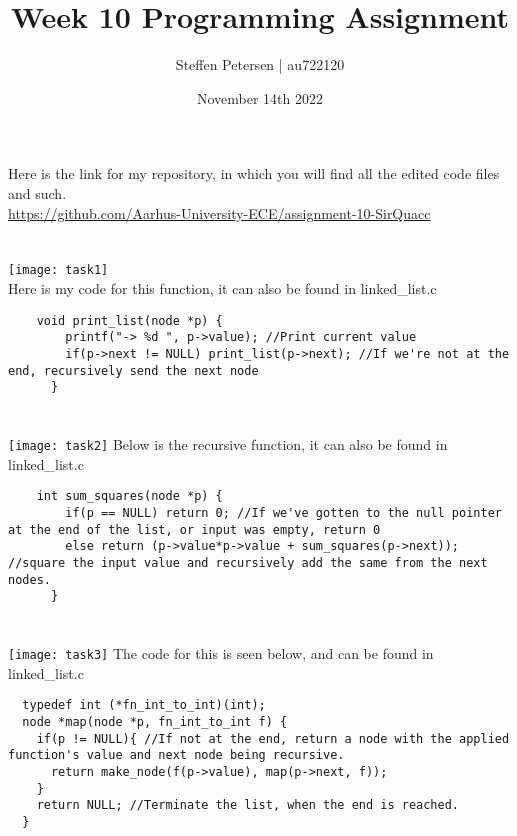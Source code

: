 \documentclass{article}
\title{Week 10 Programming Assignment}
\author{Steffen Petersen | au722120}
\date{November 14th 2022}
\begin{document}

\maketitle
\vspace{5pt}
\noindent Here is the link for my repository, in which you will find all the edited code files and such.\\
\url{https://github.com/Aarhus-University-ECE/assignment-10-SirQuacc}
\section{}
\texttt{[image: task1]}
\vspace{2pt}\\
Here is my code for this function, it can also be found in linked\_list.c
\begin{lstlisting}
    void print_list(node *p) {
        printf("-> %d ", p->value); //Print current value
        if(p->next != NULL) print_list(p->next); //If we're not at the end, recursively send the next node
      }
\end{lstlisting}


\section{}
\texttt{[image: task2]}
\vspace{2pt}
Below is the recursive function, it can also be found in linked\_list.c
\begin{lstlisting}
    int sum_squares(node *p) {
        if(p == NULL) return 0; //If we've gotten to the null pointer at the end of the list, or input was empty, return 0
        else return (p->value*p->value + sum_squares(p->next)); //square the input value and recursively add the same from the next nodes.
      }
\end{lstlisting}


\section{}
\texttt{[image: task3]} 
The code for this is seen below, and can be found in linked\_list.c
\begin{lstlisting}
  typedef int (*fn_int_to_int)(int);
  node *map(node *p, fn_int_to_int f) { 
    if(p != NULL){ //If not at the end, return a node with the applied function's value and next node being recursive.
      return make_node(f(p->value), map(p->next, f));
    }
    return NULL; //Terminate the list, when the end is reached.
  }
\end{lstlisting}
\end{document}
